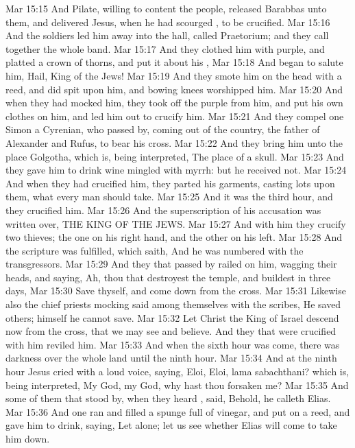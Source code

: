 \vs Mar 15:15 And  Pilate, willing to content the people, released Barabbas unto them, and delivered Jesus, when he had scourged , to be crucified.
\vs Mar 15:16 And the soldiers led him away into the hall, called Praetorium; and they call together the whole band.
\vs Mar 15:17 And they clothed him with purple, and platted a crown of thorns, and put it about his ,
\vs Mar 15:18 And began to salute him, Hail, King of the Jews!
\vs Mar 15:19 And they smote him on the head with a reed, and did spit upon him, and bowing  knees worshipped him.
\vs Mar 15:20 And when they had mocked him, they took off the purple from him, and put his own clothes on him, and led him out to crucify him.
\vs Mar 15:21 And they compel one Simon a Cyrenian, who passed by, coming out of the country, the father of Alexander and Rufus, to bear his cross.
\vs Mar 15:22 And they bring him unto the place Golgotha, which is, being interpreted, The place of a skull.
\vs Mar 15:23 And they gave him to drink wine mingled with myrrh: but he received  not.
\vs Mar 15:24 And when they had crucified him, they parted his garments, casting lots upon them, what every man should take.
\vs Mar 15:25 And it was the third hour, and they crucified him.
\vs Mar 15:26 And the superscription of his accusation was written over, THE KING OF THE JEWS.
\vs Mar 15:27 And with him they crucify two thieves; the one on his right hand, and the other on his left.
\vs Mar 15:28 And the scripture was fulfilled, which saith, And he was numbered with the transgressors.
\vs Mar 15:29 And they that passed by railed on him, wagging their heads, and saying, Ah, thou that destroyest the temple, and buildest  in three days,
\vs Mar 15:30 Save thyself, and come down from the cross.
\vs Mar 15:31 Likewise also the chief priests mocking said among themselves with the scribes, He saved others; himself he cannot save.
\vs Mar 15:32 Let Christ the King of Israel descend now from the cross, that we may see and believe. And they that were crucified with him reviled him.
\vs Mar 15:33 And when the sixth hour was come, there was darkness over the whole land until the ninth hour.
\vs Mar 15:34 And at the ninth hour Jesus cried with a loud voice, saying, Eloi, Eloi, lama sabachthani? which is, being interpreted, My God, my God, why hast thou forsaken me?
\vs Mar 15:35 And some of them that stood by, when they heard , said, Behold, he calleth Elias.
\vs Mar 15:36 And one ran and filled a spunge full of vinegar, and put  on a reed, and gave him to drink, saying, Let alone; let us see whether Elias will come to take him down.
